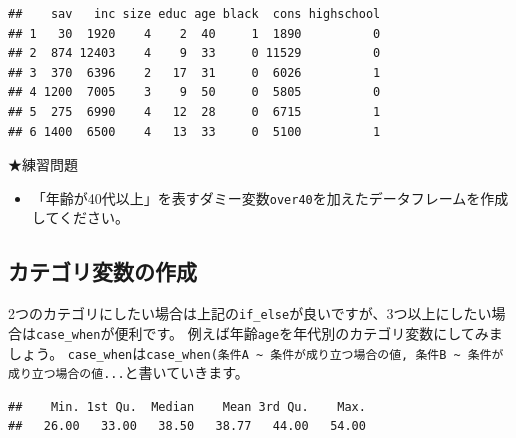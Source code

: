 \documentclass[]{book}
\newenvironment{Shaded}{\begin{snugshade}}{\end{snugshade}}
\newcommand{\KeywordTok}[1]{\textcolor[rgb]{0.13,0.29,0.53}{\textbf{#1}}}
\newcommand{\CommentTok}[1]{\textcolor[rgb]{0.56,0.35,0.01}{\textit{#1}}}
\newcommand{\OperatorTok}[1]{\textcolor[rgb]{0.81,0.36,0.00}{\textbf{#1}}}
\newcommand{\NormalTok}[1]{#1}
\providecommand{\tightlist}{%
  \setlength{\itemsep}{0pt}\setlength{\parskip}{0pt}}
\begin{document}
\begin{verbatim}
##    sav   inc size educ age black  cons highschool
## 1   30  1920    4    2  40     1  1890          0
## 2  874 12403    4    9  33     0 11529          0
## 3  370  6396    2   17  31     0  6026          1
## 4 1200  7005    3    9  50     0  5805          0
## 5  275  6990    4   12  28     0  6715          1
## 6 1400  6500    4   13  33     0  5100          1
\end{verbatim}

★練習問題

\begin{itemize}
\tightlist
\item
  「年齢が40代以上」を表すダミー変数\texttt{over40}を加えたデータフレームを作成してください。
\end{itemize}

\subsection{カテゴリ変数の作成}\label{ux30abux30c6ux30b4ux30eaux5909ux6570ux306eux4f5cux6210}

2つのカテゴリにしたい場合は上記の\texttt{if\_else}が良いですが、3つ以上にしたい場合は\texttt{case\_when}が便利です。
例えば年齢\texttt{age}を年代別のカテゴリ変数にしてみましょう。
\texttt{case\_when}は\texttt{case\_when(条件A\ \textasciitilde{}\ 条件が成り立つ場合の値,\ 条件B\ \textasciitilde{}\ 条件が成り立つ場合の値...}と書いていきます。

\begin{Shaded}
\end{Shaded}

\begin{verbatim}
##    Min. 1st Qu.  Median    Mean 3rd Qu.    Max. 
##   26.00   33.00   38.50   38.77   44.00   54.00
\end{verbatim}
\end{document}
